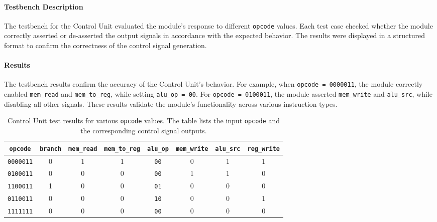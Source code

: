 \documentclass[12pt]{article}
\begin{document}
\paragraph{Testbench Description}
The testbench for the Control Unit evaluated the module's response to different \texttt{opcode} values. Each test case checked whether the module correctly asserted or de-asserted the output signals in accordance with the expected behavior. The results were displayed in a structured format to confirm the correctness of the control signal generation.

\paragraph{Results}
The testbench results confirm the accuracy of the Control Unit's behavior. For example, when \texttt{opcode = 0000011}, the module correctly enabled \texttt{mem\_read} and \texttt{mem\_to\_reg}, while setting \texttt{alu\_op = 00}. For \texttt{opcode = 0100011}, the module asserted \texttt{mem\_write} and \texttt{alu\_src}, while disabling all other signals. These results validate the module's functionality across various instruction types.

\begin{table}[ht!]
    \centering
    \renewcommand{\arraystretch}{1.1}
    \setlength{\tabcolsep}{2pt}
    \begin{tabular}{|c|c|c|c|c|c|c|c|}
        \hline
        \textbf{\texttt{opcode}} & \textbf{\texttt{branch}} & \textbf{\texttt{mem\_read}} & \textbf{\texttt{mem\_to\_reg}} & \textbf{\texttt{alu\_op}} & \textbf{\texttt{mem\_write}} & \textbf{\texttt{alu\_src}} & \textbf{\texttt{reg\_write}} \\
        \hline
        \texttt{0000011} & 0 & 1 & 1 & \texttt{00} & 0 & 1 & 1 \\
        \texttt{0100011} & 0 & 0 & 0 & \texttt{00} & 1 & 1 & 0 \\
        \texttt{1100011} & 1 & 0 & 0 & \texttt{01} & 0 & 0 & 0 \\
        \texttt{0110011} & 0 & 0 & 0 & \texttt{10} & 0 & 0 & 1 \\
        \texttt{1111111} & 0 & 0 & 0 & \texttt{00} & 0 & 0 & 0 \\
        \hline
    \end{tabular}
    \caption{Control Unit test results for various \texttt{opcode} values. The table lists the input \texttt{opcode} and the corresponding control signal outputs.}
    \label{tab:control_unit_results}
\end{table}
\end{document}
